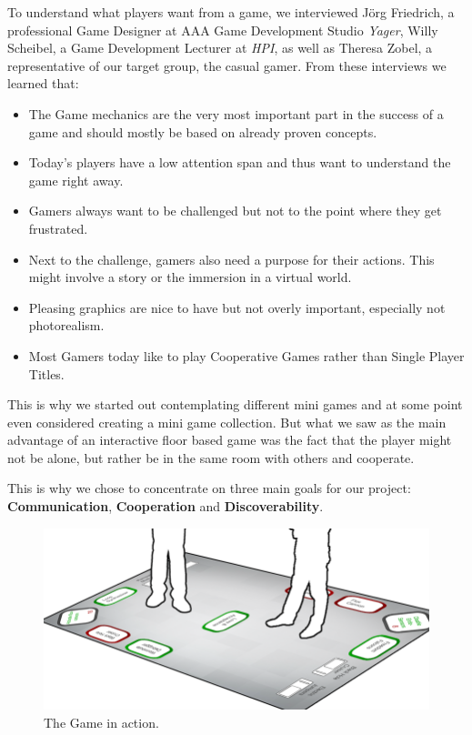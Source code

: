 \documentclass{sigchi}
\begin{document}
To understand what players want from a game, we interviewed J\"org Friedrich, a professional Game Designer at AAA Game Development Studio \textit{Yager}, Willy Scheibel, a Game Development Lecturer at \textit{HPI}, as well as Theresa Zobel, a representative of our target group, the casual gamer. From these interviews we learned that:
\begin{itemize}
\item The Game mechanics are the very most important part in the success of a game and should mostly be based on already proven concepts.
\item Today's players have a low attention span and thus want to understand the game right away.
\item Gamers always want to be challenged but not to the point where they get frustrated.
\item Next to the challenge, gamers also need a purpose for their actions. This might involve a story or the immersion in a virtual world.
\item Pleasing graphics are nice to have but not overly important, especially not photorealism.
\item Most Gamers today like to play Cooperative Games rather than Single Player Titles.
\end{itemize}


This is why we started out contemplating different mini games and at some point even considered creating a mini game collection. But what we saw as the main advantage of an interactive floor based game was the fact that the player might not be alone, but rather be in the same room with others and cooperate. 

This is why we chose to concentrate on three main goals for our project: \textbf{Communication}, \textbf{Cooperation} and \textbf{Discoverability}.



\begin{figure}[!h]
\centering
\includegraphics[width=0.99\columnwidth]{walkthrough/totale2}
\caption{The Game in action.}
\label{fig:figure1}
\end{figure}
\pagebreak
\end{document}
